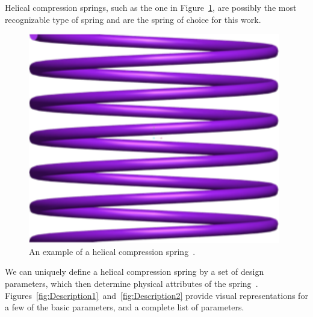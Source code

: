 \documentclass[10pt]{article}
\begin{document}
Helical compression springs, such as the one in Figure~\ref{fig:Spring}, are possibly the most recognizable type of spring and are the spring of choice for this work. 
		\begin{figure}[H]
		 \begin{center}\includegraphics[scale=.2]{Spring.png}\end{center}
		 \caption{An example of a helical compression spring~\cite{Massad2015}.}
		 \label{fig:Spring}
		 \end{figure}
We can uniquely define a helical compression spring by a set of design parameters, which then determine physical attributes of the spring~\cite{Massad2015}. Figures~\ref{fig:Description1}~and~\ref{fig:Description2} provide visual representations for a few of the basic parameters, and a complete list of parameters. 		 
\end{document}
